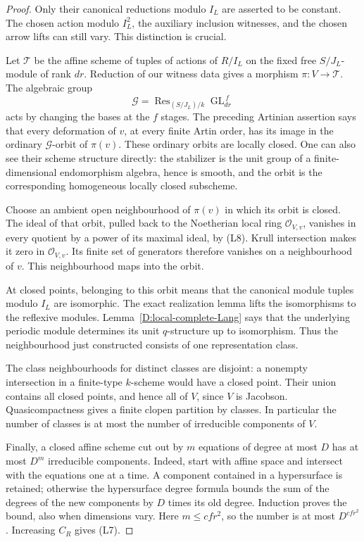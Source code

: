 \begin{proof}
Only their canonical reductions modulo \(I_L\) are asserted to
be constant. The chosen action modulo \(I_L^2\), the auxiliary
inclusion witnesses, and the chosen arrow lifts can still vary.
This distinction is crucial.

Let \(\mathcal T\) be the affine scheme of tuples of actions of
\(R/I_L\) on the fixed free \(S/J_L\)-module of rank \(dr\).
Reduction of our witness data gives a morphism
\(\pi:V\to\mathcal T\).
The algebraic group
\[
 \mathcal G=
 \operatorname{Res}_{(S/J_L)/k}
          \operatorname{GL}_{dr}^{\,f}
\]
acts by changing the bases at the \(f\) stages.
The preceding Artinian assertion says that every deformation of
\(v\), at every finite Artin order, has its image in the ordinary
\(\mathcal G\)-orbit of \(\pi(v)\).
These ordinary orbits are locally closed.
One can also see their scheme structure directly: the stabilizer
is the unit group of a finite-dimensional endomorphism algebra,
hence is smooth, and the orbit is the corresponding homogeneous
locally closed subscheme.

Choose an ambient open neighbourhood of \(\pi(v)\) in which its
orbit is closed. The ideal of that orbit, pulled back to the
Noetherian local ring \(\mathcal O_{V,v}\), vanishes in every
quotient by a power of its maximal ideal, by (L8).
Krull intersection makes it zero in \(\mathcal O_{V,v}\).
Its finite set of generators therefore vanishes on a neighbourhood
of \(v\). This neighbourhood maps into the orbit.

At closed points, belonging to this orbit means that the canonical
module tuples modulo \(I_L\) are isomorphic. The exact realization
lemma lifts the isomorphisms to the reflexive modules.
Lemma~\ref{D:local-complete-Lang} says that the underlying periodic
module determines its unit \(q\)-structure up to isomorphism.
Thus the neighbourhood just constructed consists of one
representation class.

The class neighbourhoods for distinct classes are disjoint:
a nonempty intersection in a finite-type \(k\)-scheme would have
a closed point. Their union contains all closed points, and hence
all of \(V\), since \(V\) is Jacobson. Quasicompactness gives a
finite clopen partition by classes. In particular the number of
classes is at most the number of irreducible components of \(V\).

Finally, a closed affine scheme cut out by \(m\) equations of
degree at most \(D\) has at most \(D^m\) irreducible components.
Indeed, start with affine space and intersect with the equations
one at a time. A component contained in a hypersurface is retained;
otherwise the hypersurface degree formula bounds the sum of
the degrees of the new components by \(D\) times its old degree.
Induction proves the bound, also when dimensions vary.
Here \(m\leq cfr^2\), so the number is at most \(D^{cfr^2}\).
Increasing \(C_R\) gives (L7).
\end{proof}


